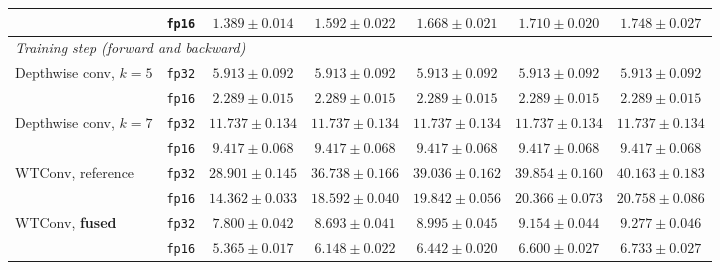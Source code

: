\documentclass[10pt]{article} %
\theoremstyle{plain}
\begin{document}
\begin{table}[htpb]
\begin{tabular}{llccccc}
 & \texttt{fp16} & $1.389\pm0.014$ & $1.592\pm0.022$ & $1.668\pm0.021$ & $1.710\pm0.020$ & $1.748\pm0.027$ \\
\midrule
\multicolumn{7}{l}{\textit{Training step (forward and backward)}} \\
\addlinespace[2pt]
Depthwise conv, $k{=}5$ & \texttt{fp32} & $5.913\pm0.092$ & $5.913\pm0.092$ & $5.913\pm0.092$ & $5.913\pm0.092$ & $5.913\pm0.092$ \\
 & \texttt{fp16} & $2.289\pm0.015$ & $2.289\pm0.015$ & $2.289\pm0.015$ & $2.289\pm0.015$ & $2.289\pm0.015$ \\
\addlinespace[2pt]
Depthwise conv, $k{=}7$ & \texttt{fp32} & $11.737\pm0.134$ & $11.737\pm0.134$ & $11.737\pm0.134$ & $11.737\pm0.134$ & $11.737\pm0.134$ \\
 & \texttt{fp16} & $9.417\pm0.068$ & $9.417\pm0.068$ & $9.417\pm0.068$ & $9.417\pm0.068$ & $9.417\pm0.068$ \\
\addlinespace[2pt]
WTConv, reference & \texttt{fp32} & $28.901\pm0.145$ & $36.738\pm0.166$ & $39.036\pm0.162$ & $39.854\pm0.160$ & $40.163\pm0.183$ \\
 & \texttt{fp16} & $14.362\pm0.033$ & $18.592\pm0.040$ & $19.842\pm0.056$ & $20.366\pm0.073$ & $20.758\pm0.086$ \\
\addlinespace[2pt]
WTConv, \textbf{fused} & \texttt{fp32} & $7.800\pm0.042$ & $8.693\pm0.041$ & $8.995\pm0.045$ & $9.154\pm0.044$ & $9.277\pm0.046$ \\
 & \texttt{fp16} & $5.365\pm0.017$ & $6.148\pm0.022$ & $6.442\pm0.020$ & $6.600\pm0.027$ & $6.733\pm0.027$ \\
\bottomrule
\end{tabular}
\end{table}
\end{document}
